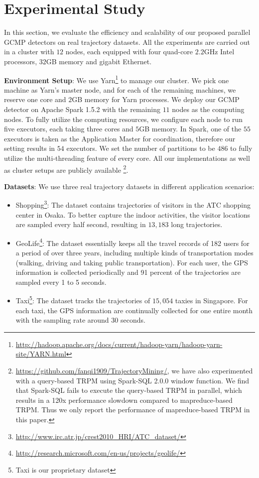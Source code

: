 \section{Experimental Study}
\label{sec:exp}
In this section, we evaluate the efficiency and scalability of our proposed parallel GCMP detectors on real trajectory datasets. All the experiments are carried out in a cluster with $12$ nodes, each equipped with four quad-core $2.2$GHz Intel processors, $32$GB memory and gigabit Ethernet. 

\textbf{Environment Setup}: We use Yarn\footnote{\url{http://hadoop.apache.org/docs/current/hadoop-yarn/hadoop-yarn-site/YARN.html}} to manage our cluster. We pick one machine as Yarn's master node, and for each of the remaining machines, we reserve one core and $2$GB memory for Yarn processes. We deploy our GCMP detector on Apache Spark 1.5.2 with the remaining $11$ nodes as the computing nodes.
To fully utilize the computing resources, we configure each node to run five executors, each taking three cores and $5$GB memory. In Spark, one of the $55$ executors is taken as the Application Master for coordination, therefore our setting results in $54$ executors.  We set the number of partitions to be $486$ to fully utilize the multi-threading feature of every core.
All our implementations as well as cluster setups are publicly available%
\footnote{\url{https://github.com/fanqi1909/TrajectoryMining/}, we have also experimented with a query-based TRPM using Spark-SQL 2.0.0 window function. 
We find that Spark-SQL fails to execute the query-based TRPM in parallel, which results in a 120x performance slowdown compared to mapreduce-based TRPM.
%
Thus we only report the performance of mapreduce-based TRPM in this paper.}.

\textbf{Datasets}: We use three real trajectory datasets in different application scenarios:
\begin{itemize}[nosep]
\item{Shopping}\footnote{\url{http://www.irc.atr.jp/crest2010_HRI/ATC_dataset/}}: The dataset contains
  trajectories of visitors in the ATC shopping center in Osaka. To better capture the indoor activities, the visitor locations are sampled every half second, resulting in $13,183$ long trajectories. 
\item{GeoLife}\footnote{\url{http://research.microsoft.com/en-us/projects/geolife/}}: The dataset essentially keeps all the travel records of 182 users for a period
of over three years, including multiple kinds of transportation modes (walking, driving and taking public
transportation). For each user, the GPS information is collected periodically and 91 percent of the trajectories
are sampled every 1 to 5 seconds.
\item{Taxi}\footnote{Taxi is our proprietary dataset}: The dataset tracks the trajectories of $15,054$ taxies in Singapore. For each taxi, the GPS information are continually collected for one entire month with the sampling rate around 30 seconds.
\end{itemize}


